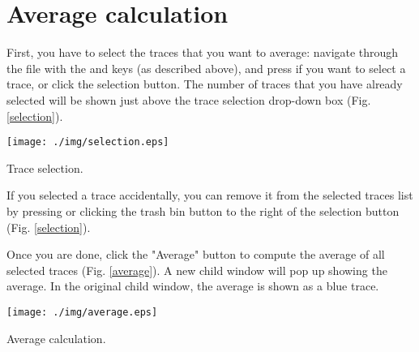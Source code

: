 \section{Average calculation}
First, you have to select the traces that you want to average: navigate through the file with the \keybox{$\leftarrow$} and \keybox{$\rightarrow$} keys (as described above), and press  if you want to select a trace, or click the selection button. The number of traces that you have already selected will be shown just above the trace selection drop-down box (Fig. \ref{selection}).
  \begin{myfigure}[ht]
    \begin{center}
      \texttt{[image: ./img/selection.eps]}
    \end{center}
    \caption{Trace selection.}
    \label{selection}
  \end{myfigure}
If you selected a trace accidentally, you can remove it from the selected traces list by pressing  or clicking the trash bin button to the right of the selection button (Fig. \ref{selection}).

Once you are done, click the "Average" button to compute the average of all selected traces (Fig. \ref{average}). A new child window will pop up showing the average. In the original child window, the average is shown as a blue trace.
  \begin{myfigure}[ht]
    \begin{center}
      \texttt{[image: ./img/average.eps]}
    \end{center}
    \caption{Average calculation.}
    \label{average}
  \end{myfigure}
\, \\ \smallskip
{}

